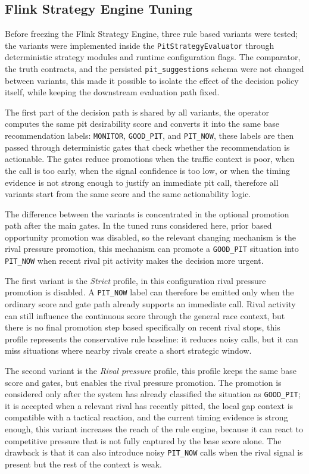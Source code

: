 \subsection{Flink Strategy Engine Tuning}
\label{sec:flink_tuning}

Before freezing the Flink Strategy Engine, three rule based variants were tested; the variants were implemented inside the \texttt{PitStrategyEvaluator} through 
deterministic strategy modules and runtime configuration flags. The comparator, the truth contracts, and the persisted \texttt{pit\_suggestions} schema were not changed between 
variants, this made it possible to isolate the effect of the decision policy itself, while keeping the downstream evaluation path fixed.

The first part of the decision path is shared by all variants, the operator computes the same pit desirability score and converts it into the same base recommendation 
labels: \texttt{MONITOR}, \texttt{GOOD\_PIT}, and \texttt{PIT\_NOW}, these labels are then passed through deterministic gates that check whether the recommendation is actionable. 
The gates reduce promotions when the traffic context is poor, when the call is too early, when the signal confidence is too low, or when the timing evidence is not 
strong enough to justify an immediate pit call, therefore all variants start from the same score and the same actionability logic.

The difference between the variants is concentrated in the optional promotion path after the main gates. In the tuned runs considered here, prior based opportunity promotion 
was disabled, so the relevant changing mechanism is the rival pressure promotion, this mechanism can promote a \texttt{GOOD\_PIT} situation into \texttt{PIT\_NOW} when 
recent rival pit activity makes the decision more urgent.

The first variant is the \textit{Strict} profile, in this configuration rival pressure promotion is disabled. A \texttt{PIT\_NOW} label can therefore be emitted only when 
the ordinary score and gate path already supports an immediate call. Rival activity can still influence the continuous score through the general race context, but there is 
no final promotion step based specifically on recent rival stops, this profile represents the conservative rule baseline: it reduces noisy calls, but it can miss situations 
where nearby rivals create a short strategic window.

The second variant is the \textit{Rival pressure} profile, this profile keeps the same base score and gates, but enables the rival pressure promotion. The promotion is 
considered only after the system has already classified the situation as \texttt{GOOD\_PIT}; it is accepted when a relevant rival has recently pitted, the local gap context 
is compatible with a tactical reaction, and the current timing evidence is strong enough, this variant increases the reach of the rule engine, because it can react to 
competitive pressure that is not fully captured by the base score alone. The drawback is that it can also introduce noisy \texttt{PIT\_NOW} calls when the rival signal is 
present but the rest of the context is weak.

